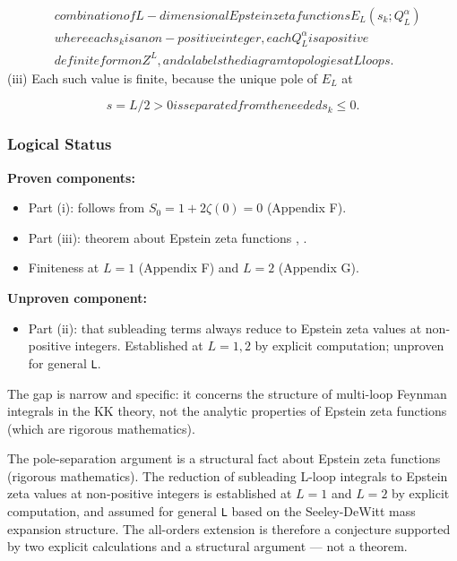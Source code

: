 \documentclass[aps,prd,preprint,superscriptaddress,longbibliography,floatfix]{revtex4-2}
\theoremstyle{remark}
\begin{document}
\begin{align}
    & combination of L-dimensional Epstein zeta functions E_L(s_k; Q_L^{\alpha}) \\
    & where each s_k is a non-positive integer, each Q_L^{\alpha} is a positive \\
    & definite form on Z^{L}, and \alpha labels the diagram topologies at L loops.
\end{align}
(iii) Each such value is finite, because the unique pole of $E_L$ at

\begin{equation}
    s = L/2 > 0 is separated from the needed s_k \leq 0.
\end{equation}

\subsubsection{Logical Status}

\textbf{Proven components:}

\begin{itemize}
  \item Part (i): follows from $S_{0} = 1 + 2\zeta(0) = 0$ (Appendix F).
  \item Part (iii): theorem about Epstein zeta functions \cite{Epstein1903}, \cite{Terras1985}.
  \item Finiteness at $L = 1$ (Appendix F) and $L = 2$ (Appendix G).
\end{itemize}

\textbf{Unproven component:}

\begin{itemize}
  \item Part (ii): that subleading terms always reduce to Epstein zeta values at non-positive integers. Established at $L = 1, 2$ by explicit computation; unproven for general \texttt{L}.
\end{itemize}

The gap is narrow and specific: it concerns the structure of multi-loop Feynman integrals in the KK theory, not the analytic properties of Epstein zeta functions (which are rigorous mathematics).

The pole-separation argument is a structural fact about Epstein zeta functions (rigorous mathematics). The reduction of subleading L-loop integrals to Epstein zeta values at non-positive integers is established at $L = 1$ and $L = 2$ by explicit computation, and assumed for general \texttt{L} based on the Seeley-DeWitt mass expansion structure. The all-orders extension is therefore a conjecture supported by two explicit calculations and a structural argument --- not a theorem.
\end{document}
